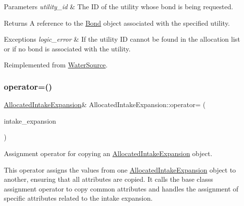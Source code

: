 \begin{DoxyParams}{Parameters}
{\em utility\+\_\+id} & The ID of the utility whose bond is being requested.\\
\hline
\end{DoxyParams}
\begin{DoxyReturn}{Returns}
A reference to the {\ttfamily \mbox{\hyperlink{classBond}{Bond}}} object associated with the specified utility.
\end{DoxyReturn}

\begin{DoxyExceptions}{Exceptions}
{\em logic\+\_\+error} & If the utility ID cannot be found in the allocation list or if no bond is associated with the utility. \\
\hline
\end{DoxyExceptions}


Reimplemented from \mbox{\hyperlink{classWaterSource_acacef71453819480c5438ae5b433e66b}{Water\+Source}}.

\mbox{\label{classAllocatedIntakeExpansion_a3c695346b66343278a51c3df50866acb}} 
\subsubsection{\texorpdfstring{operator=()}{operator=()}}
{\footnotesize\ttfamily \mbox{\hyperlink{classAllocatedIntakeExpansion}{Allocated\+Intake\+Expansion}}\& Allocated\+Intake\+Expansion\+::operator= (\begin{DoxyParamCaption}\item[{const \mbox{\hyperlink{classAllocatedIntakeExpansion}{Allocated\+Intake\+Expansion}} \&}]{intake\+\_\+expansion }\end{DoxyParamCaption})}



Assignment operator for copying an {\ttfamily \mbox{\hyperlink{classAllocatedIntakeExpansion}{Allocated\+Intake\+Expansion}}} object. 

This operator assigns the values from one {\ttfamily \mbox{\hyperlink{classAllocatedIntakeExpansion}{Allocated\+Intake\+Expansion}}} object to another, ensuring that all attributes are copied. It calls the base class\textquotesingle{}s assignment operator to copy common attributes and handles the assignment of specific attributes related to the intake expansion.



